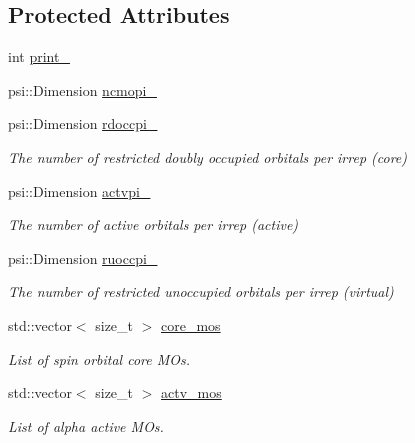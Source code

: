 \subsection*{Protected Attributes}
\begin{DoxyCompactItemize}
\item 
int \mbox{\hyperlink{classforte_1_1_s_o_m_r_d_s_r_g_ad7c91c0bbb3938e19d01a55bbf8eee21}{print\+\_\+}}
\item 
psi\+::\+Dimension \mbox{\hyperlink{classforte_1_1_s_o_m_r_d_s_r_g_ad2ac3626cb111d8f5d8fac6538434bd0}{ncmopi\+\_\+}}
\item 
psi\+::\+Dimension \mbox{\hyperlink{classforte_1_1_s_o_m_r_d_s_r_g_a1184de99d1b34a34034dcc1da1b97abc}{rdoccpi\+\_\+}}
\begin{DoxyCompactList}\small\item\em The number of restricted doubly occupied orbitals per irrep (core) \end{DoxyCompactList}\item 
psi\+::\+Dimension \mbox{\hyperlink{classforte_1_1_s_o_m_r_d_s_r_g_a9a7206b01fb3cf36c071af1c4cbf6ea9}{actvpi\+\_\+}}
\begin{DoxyCompactList}\small\item\em The number of active orbitals per irrep (active) \end{DoxyCompactList}\item 
psi\+::\+Dimension \mbox{\hyperlink{classforte_1_1_s_o_m_r_d_s_r_g_a784c0b278066ab31d5350444bba8ee59}{ruoccpi\+\_\+}}
\begin{DoxyCompactList}\small\item\em The number of restricted unoccupied orbitals per irrep (virtual) \end{DoxyCompactList}\item 
std\+::vector$<$ size\+\_\+t $>$ \mbox{\hyperlink{classforte_1_1_s_o_m_r_d_s_r_g_ad6be6547d77988dfb082290a9d75b881}{core\+\_\+mos}}
\begin{DoxyCompactList}\small\item\em List of spin orbital core M\+Os. \end{DoxyCompactList}\item 
std\+::vector$<$ size\+\_\+t $>$ \mbox{\hyperlink{classforte_1_1_s_o_m_r_d_s_r_g_a3cc5b852c16d889e887a72434c2fad92}{actv\+\_\+mos}}
\begin{DoxyCompactList}\small\item\em List of alpha active M\+Os. \end{DoxyCompactList}\item 

\end{DoxyCompactItemize}
